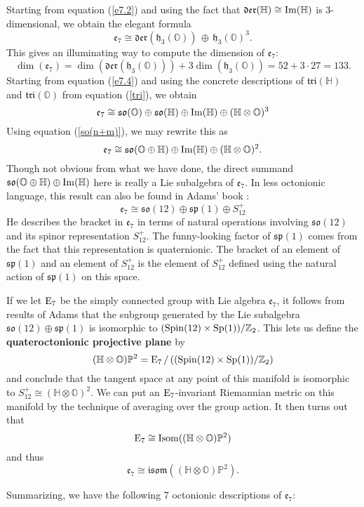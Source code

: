 \documentclass[12pt]{article}
\newcommand\Z{{\mathbb Z}}
\renewcommand\H{{\mathbb H}}
\renewcommand\O{{\mathbb O}}
\renewcommand\P{{\mathbb P}}
\newcommand{\Sp}{{\rm Sp}}
\newcommand{\Spin}{{\rm Spin}}
\newcommand{\E}{{\rm E}}
\newcommand{\so}{{\mathfrak {so}}}
\newcommand{\symp}{{\mathfrak {sp}}}
\newcommand{\e}{{\mathfrak {e}}}
\newcommand{\h}{{\mathfrak {h}}}
\newcommand{\isom}{{\mathfrak {isom}}}
\newcommand{\Isom}{{\rm Isom}}
\newcommand{\Der}{{\mathfrak {der}}}
\newcommand{\Tri}{{\mathfrak {tri}}}
\renewcommand{\Im}{{\rm Im}}
\newcommand{\tensor}{\otimes}
\newcommand{\iso}{\cong}
\begin{document}
Starting from equation (\ref{e7.2}) and using the fact that
$\Der(\H) \iso \Im(\H)$ is 3-dimensional, we obtain the elegant
formula
\[ 
\e_7 \iso \Der(\h_3(\O)) \, \oplus \, \h_3(\O)^3  .
\label{e7.5}
\]
This gives an illuminating way to compute the dimension of $\e_7$:
\[ \dim(\e_7) = \dim(\Der(\h_3(\O))) + 3 \dim(\h_3(\O)) = 52 + 3 \cdot 27 = 
133 .\]
Starting from equation (\ref{e7.4}) and using the concrete 
descriptions of $\Tri(\H)$ and $\Tri(\O)$ from equation
(\ref{tri}), we obtain
\[
\e_7 \iso \so(\O) \oplus \so(\H) \oplus \Im(\H) \oplus (\H \tensor \O)^3 
\label{e7.6}
\]
Using equation (\ref{so(n+m)}), we may rewrite this as
\[
\e_7 \iso \so(\O \oplus \H) \oplus \Im(\H) \oplus (\H \tensor \O)^2.
\label{e7.7}
\]
Though not obvious from what we have done, the direct summand $\so(\O
\oplus \H) \oplus \Im(\H)$ here is really a Lie subalgebra of $\e_7$. In
less octonionic language, this result can also be found in Adams' book
\cite{Adams}:
\[
\e_7 \iso \so(12) \oplus \symp(1) \oplus S_{12}^+ 
\label{e7.8}
\]
He describes the bracket in $\e_7$ in terms of natural operations
involving $\so(12)$ and its spinor representation $S_{12}^+$.   The
funny-looking factor of $\symp(1)$ comes from the fact that this
representation is quaternionic.  The bracket of an element of $\symp(1)$ and
an element of $S_{12}^+$ is the element of $S_{12}^+$ defined using
the natural action of $\symp(1)$ on this space.

If we let $\E_7$ be the simply connected group with Lie 
algebra $\e_7$, it follows from results of Adams \cite{Adams} that the
subgroup generated by the Lie subalgebra $\so(12) \oplus \symp(1)$ is
isomorphic to $(\Spin(12) \times \Sp(1))/\Z_2$.  
This lets us define the {\bf quateroctonionic projective plane} by
\[    (\H \tensor \O)\P^2 = \E_7\, / \,((\Spin(12) \times \Sp(1))/\Z_2) \]
and conclude that the tangent space at any point of this manifold is
isomorphic to $S_{12}^+ \iso (\H \tensor \O)^2$.   We can put 
an $\E_7$-invariant Riemannian metric on this manifold by the technique
of averaging over the group action.  It then turns out \cite{Besse} that
\[        \E_7 \iso \Isom((\H \tensor \O)\P^2)
\]
and thus
\[
\e_7 \iso \isom((\H \tensor \O)\P^2)  .
\label{e7.9}
\]

Summarizing, we have the following 7 octonionic descriptions of $\e_7$:   
   
\end{document}
